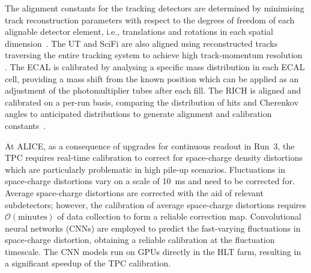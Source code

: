 The alignment constants for the tracking detectors are determined by minimising track reconstruction parameters with respect to the degrees of freedom of each alignable detector element, i.e., translations and rotations in each spatial dimension~\cite{LHCb:wouter-kf}. The UT and SciFi are also aligned using reconstructed tracks traversing the entire tracking system to achieve high track-momentum resolution \cite{Reiss:2846414}. The ECAL is calibrated by analysing a specific mass distribution in each ECAL cell, providing a mass shift from the known position which can be applied as an adjustment of the photomultiplier tubes after each fill. The RICH is aligned and calibrated on a per-run basis, comparing the distribution of hits and Cherenkov angles to anticipated distributions to generate alignment and calibration constants~\cite{LHCb:RICH_AlignCalib}.

At ALICE, as a consequence of upgrades for continuous readout in Run~3, the TPC requires real-time calibration to correct for space-charge density distortions which are particularly problematic in high pile-up scenarios. Fluctuations in space-charge distortions vary on a scale of \SI{10}{\milli\second} and need to be corrected for. Average space-charge distortions are corrected with the aid of relevant subdetectors; however, the calibration of average space-charge distortions requires $\mathcal{O}\left(\mathrm{minutes}\right)$ of data collection to form a reliable correction map. Convolutional neural networks (CNNs) are employed to predict the fast-varying fluctuations in space-charge distortion, obtaining a reliable calibration at the fluctuation timescale. The CNN models run on GPUs directly in the HLT farm, resulting in a significant speedup of the TPC calibration.
